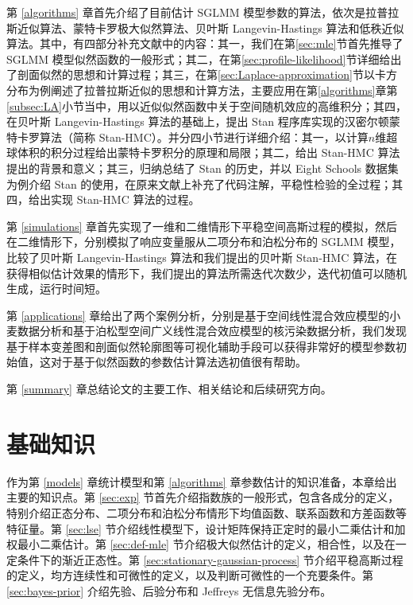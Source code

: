 \documentclass[12pt,a4paper,UTF8,twoside]{book}
\theoremstyle{definition}
\theoremstyle{definition}
\theoremstyle{definition}
\theoremstyle{remark}
\begin{document}
第 \ref{algorithms} 章首先介绍了目前估计 SGLMM 模型参数的算法，依次是拉普拉斯近似算法、蒙特卡罗极大似然算法、贝叶斯 Langevin-Hastings 算法和低秩近似算法。其中，有四部分补充文献中的内容：其一，我们在第\ref{sec:mle}节首先推导了 SGLMM 模型似然函数的一般形式；其二，在第\ref{sec:profile-likelihood}节详细给出了剖面似然的思想和计算过程；其三，在第\ref{sec:Laplace-approximation}节以卡方分布为例阐述了拉普拉斯近似的思想和计算方法，主要应用在第\ref{algorithms}章第\ref{subsec:LA}小节当中，用以近似似然函数中关于空间随机效应的高维积分；其四，在贝叶斯 Langevin-Hastings 算法的基础上，提出 Stan 程序库实现的汉密尔顿蒙特卡罗算法（简称 Stan-HMC）。并分四小节进行详细介绍：其一，以计算\(n\)维超球体积的积分过程给出蒙特卡罗积分的原理和局限；其二，给出 Stan-HMC 算法提出的背景和意义；其三，归纳总结了 Stan 的历史，并以 Eight Schools 数据集为例介绍 Stan 的使用，在原来文献上补充了代码注解，平稳性检验的全过程；其四，给出实现 Stan-HMC 算法的过程。

第 \ref{simulations} 章首先实现了一维和二维情形下平稳空间高斯过程的模拟，然后在二维情形下，分别模拟了响应变量服从二项分布和泊松分布的 SGLMM 模型，比较了贝叶斯 Langevin-Hastings 算法和我们提出的贝叶斯 Stan-HMC 算法，在获得相似估计效果的情形下，我们提出的算法所需迭代次数少，迭代初值可以随机生成，运行时间短。

第 \ref{applications} 章给出了两个案例分析，分别是基于空间线性混合效应模型的小麦数据分析和基于泊松型空间广义线性混合效应模型的核污染数据分析，我们发现基于样本变差图和剖面似然轮廓图等可视化辅助手段可以获得非常好的模型参数初始值，这对于基于似然函数的参数估计算法选初值很有帮助。

第 \ref{summary} 章总结论文的主要工作、相关结论和后续研究方向。

\hypertarget{prepare}{%
\chapter{基础知识}\label{prepare}}

作为第 \ref{models} 章统计模型和第 \ref{algorithms} 章参数估计的知识准备，本章给出主要的知识点。第 \ref{sec:exp} 节首先介绍指数族的一般形式，包含各成分的定义，特别介绍正态分布、二项分布和泊松分布情形下均值函数、联系函数和方差函数等特征量。第 \ref{sec:lse} 节介绍线性模型下，设计矩阵保持正定时的最小二乘估计和加权最小二乘估计。第 \ref{sec:def-mle} 节介绍极大似然估计的定义，相合性，以及在一定条件下的渐近正态性。第 \ref{sec:stationary-gaussian-process} 节介绍平稳高斯过程的定义，均方连续性和可微性的定义，以及判断可微性的一个充要条件。第 \ref{sec:bayes-prior} 介绍先验、后验分布和 Jeffreys 无信息先验分布。
\end{document}

